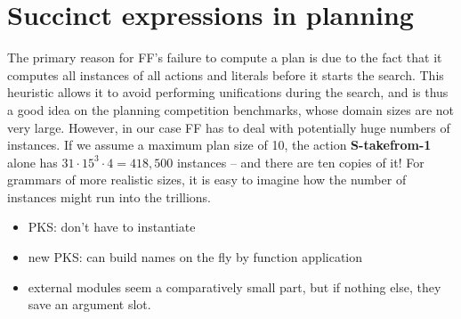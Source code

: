 \section{Succinct expressions in planning}
\label{sec:howto}

The primary reason for FF's failure to compute a plan is due to the
fact that it computes all instances of all actions and literals before
it starts the search.  This heuristic allows it to avoid performing
unifications during the search, and is thus a good idea on the
planning competition benchmarks, whose domain sizes are not very
large.  However, in our case FF has to deal with potentially huge
numbers of instances.  If we assume a maximum plan size of 10, the
action \textbf{S-takefrom-1} alone has $31 \cdot 15^3 \cdot 4 =
418,500$ instances -- and there are ten copies of it!  For grammars of
more realistic sizes, it is easy to imagine how the number of
instances might run into the trillions.

\begin{itemize}
\item PKS: don't have to instantiate
\item new PKS: can build names on the fly by function application
\item external modules seem a comparatively small part, but if nothing
  else, they save an argument slot.
\end{itemize}



